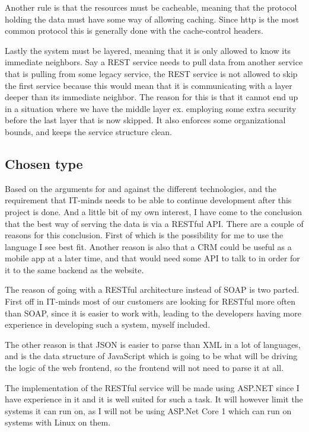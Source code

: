 Another rule is that the resources must be cacheable, meaning that the protocol holding the data must have some way of allowing caching. Since http is the most common protocol this is generally done with the cache-control headers\cite{rest:elkstein:architeture}.

Lastly the system must be layered\cite{rest:uci}, meaning that it is only allowed to know its immediate neighbors. Say a REST service needs to pull data from another service that is pulling from some legacy service, the REST service is not allowed to skip the first service because this would mean that it is communicating with a layer deeper than its immediate neighbor. The reason for this is that it cannot end up in a situation where we have the middle layer ex. employing some extra security before the last layer that is now skipped. It also enforces some organizational bounds, and keeps the service structure clean.

\subsection{Chosen type }
\label{sub:Chosen type}
Based on the arguments for and against the different technologies, and the requirement that IT-minds needs to be able to continue development after this project is done. And a little bit of my own interest, I have come to the conclusion that the best way of serving the data is via a RESTful API. There are a couple of reasons for this conclusion. First of which is the possibility for me to use the language I see best fit. Another reason is also that a CRM could be useful as a mobile app at a later time, and that would need some API to talk to in order for it to the same backend as the website.

The reason of going with a RESTful architecture instead of SOAP is two parted. First off in IT-minds most of our customers are looking for RESTful more often than SOAP, since it is easier to work with, leading to the developers having more experience in developing such a system, myself included.

The other reason is that JSON is easier to parse than XML in a lot of languages, and is the data structure of  JavaScript which is going to be what will be driving the logic of the web frontend, so the frontend will not need to parse it at all.

The implementation of the RESTful service will be made using ASP.NET since I have experience in it and it is well suited for such a task. It will however limit the systems it can run on, as I will not be using ASP.Net Core 1 which can run on systems with Linux on them\cite{asp5:intro}.

